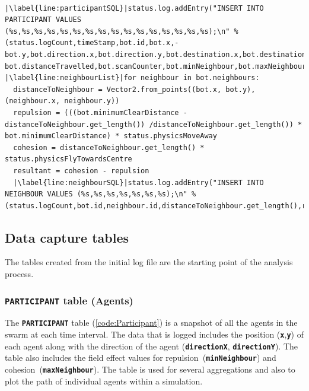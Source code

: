 \lstset{language=Python,
basicstyle=\tiny,
numbers=left, 
numberstyle=\tiny,
captionpos=b,
keepspaces=true,
showspaces=false, 
showstringspaces=false,
showtabs=false,
frame=single,
breaklines=true,
caption=Simulator data capture,
escapechar=|
} %
\begin{lstlisting}[label={code:SQL2}]  % Start your code-block

|\label{line:participantSQL}|status.log.addEntry("INSERT INTO PARTICIPANT VALUES (%s,%s,%s,%s,%s,%s,%s,%s,%s,%s,%s,%s,%s,%s,%s,%s);\n" % (status.logCount,timeStamp,bot.id,bot.x,-bot.y,bot.direction.x,bot.direction.y,bot.destination.x,bot.destination.y,bot.alive, bot.distanceTravelled,bot.scanCounter,bot.minNeighbour,bot.maxNeighbour,bot.isPerimeter,bot.scanning))
|\label{line:neighbourList}|for neighbour in bot.neighbours:
  distanceToNeighbour = Vector2.from_points((bot.x, bot.y),(neighbour.x, neighbour.y))
  repulsion = (((bot.minimumClearDistance - distanceToNeighbour.get_length()) /distanceToNeighbour.get_length()) * bot.minimumClearDistance) * status.physicsMoveAway
  cohesion = distanceToNeighbour.get_length() * status.physicsFlyTowardsCentre
  resultant = cohesion - repulsion
  |\label{line:neighbourSQL}|status.log.addEntry("INSERT INTO NEIGHBOUR VALUES (%s,%s,%s,%s,%s,%s,%s);\n" % (status.logCount,bot.id,neighbour.id,distanceToNeighbour.get_length(),resultant,cohesion,repulsion))
\end{lstlisting}

\subsection{Data capture tables}
The tables created from the initial log file are the starting point of the analysis process. 

\subsubsection{\texttt{\textbf{PARTICIPANT}} table (Agents)}
The \texttt{\textbf{PARTICIPANT}} table (\autoref{code:Participant}) is a snapshot of all the agents in the swarm at each time interval. The data that is logged includes the position (\texttt{\textbf{x}},\texttt{\textbf{y}}) of each agent along with the direction of the agent (\texttt{\textbf{directionX}}, \texttt{\textbf{directionY}}). The table also includes the field effect values for repulsion~(\texttt{\textbf{minNeighbour}}) and cohesion~(\texttt{\textbf{maxNeighbour}}). The table is used for several aggregations and also to plot the path of individual agents within a simulation.

